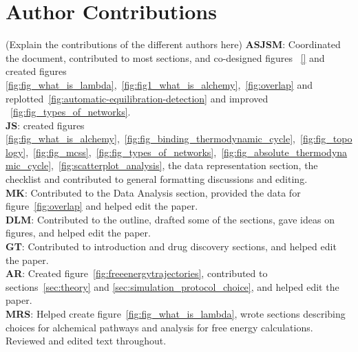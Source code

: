 \documentclass[9pt,bestpractices]{livecoms}
\begin{document}
\section*{Author Contributions}
%
(Explain the contributions of the different authors here)
\textbf{ASJSM}: Coordinated the document, contributed to most sections, and co-designed figures ~\ref{} and created figures \ref{fig:fig_what_is_lambda},~\ref{fig:fig1_what_is_alchemy},~\ref{fig:overlap} and replotted~\ref{fig:automatic-equilibration-detection} and improved ~\ref{fig:fig_types_of_networks}.\\
\textbf{JS}: created figures \ref{fig:fig_what_is_alchemy},~\ref{fig:fig_binding_thermodynamic_cycle},~\ref{fig:fig_topology},~\ref{fig:fig_mcss},~\ref{fig:fig_types_of_networks},~\ref{fig:fig_absolute_thermodynamic_cycle},~\ref{fig:scatterplot_analysis}, the data representation section, the checklist and contributed to general formatting discussions and editing.\\
\textbf{MK}: Contributed to the Data Analysis section, provided the data for figure~\ref{fig:overlap} and helped edit the paper.\\
\textbf{DLM}: Contributed to the outline, drafted some of the sections, gave ideas on figures, and helped edit the paper.\\
\textbf{GT}: Contributed to introduction and drug discovery sections, and helped edit the paper.\\
\textbf{AR}: Created figure~\ref{fig:freeenergytrajectories}, contributed to sections~\ref{sec:theory} and \ref{sec:simulation_protocol_choice}, and helped edit the paper.\\
\textbf{MRS}: Helped create figure~\ref{fig:fig_what_is_lambda}, wrote sections describing choices for alchemical pathways and analysis for free energy calculations. Reviewed and edited text throughout.\\
\end{document}
